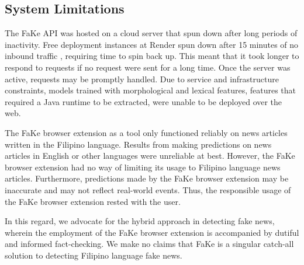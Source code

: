 \subsection{System Limitations} \label{extension-limitations}

The FaKe API was hosted on a cloud server that spun down after long periods of inactivity. Free deployment instances at Render spun down after 15 minutes of no inbound traffic \cite{render-docs}, requiring time to spin back up. This meant that it took longer to respond to requests if no request were sent for a long time. Once the server was active, requests may be promptly handled. Due to service and infrastructure constraints, models trained with morphological and lexical features, features that required a Java runtime to be extracted, were unable to be deployed over the web.

The FaKe browser extension as a tool only functioned reliably on news articles written in the Filipino language. Results from making predictions on news articles in English or other languages were unreliable at best. However, the FaKe browser extension had no way of limiting its usage to Filipino language news articles. Furthermore, predictions made by the FaKe browser extension may be inaccurate and may not reflect real-world events. Thus, the responsible usage of the FaKe browser extension rested with the user.

In this regard, we advocate for the hybrid approach in detecting fake news, wherein the employment of the FaKe browser extension is accompanied by dutiful and informed fact-checking. We make no claims that FaKe is a singular catch-all solution to detecting Filipino language fake news.